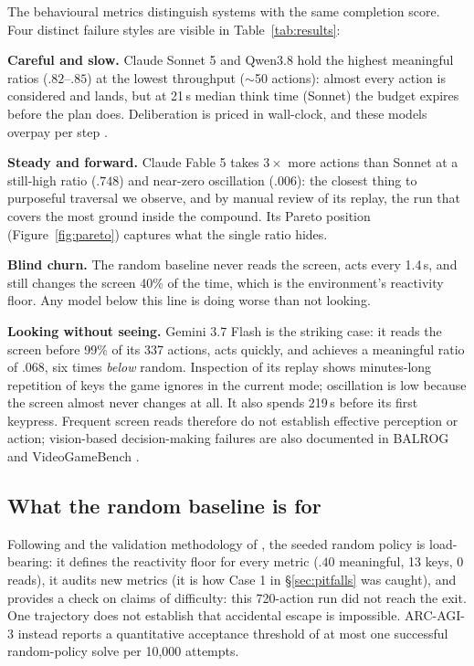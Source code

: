 \documentclass{article} %
\begin{document}
The behavioural metrics distinguish systems with the same completion score.
Four distinct failure styles are visible in
Table~\ref{tab:results}:

\textbf{Careful and slow.} Claude Sonnet 5 and Qwen3.8 hold the highest
meaningful ratios ($.82$--$.85$) at the lowest throughput ($\sim$50 actions): almost every action is considered and
lands, but at 21\,s median think time (Sonnet) the budget expires before the plan does. Deliberation is priced in
wall-clock, and these models overpay per step
\citep[cf.\ dynamic thinking in][]{phan2025textquests}.

\textbf{Steady and forward.} Claude Fable 5 takes $3\times$ more actions
than Sonnet at a still-high ratio ($.748$) and near-zero oscillation ($.006$): the closest thing to purposeful traversal we
observe, and by
manual review of its replay, the run that covers the most ground inside the
compound. Its Pareto position (Figure~\ref{fig:pareto}) captures what the
single ratio hides.

\textbf{Blind churn.} The random baseline never reads the screen, acts
every 1.4\,s, and still changes the screen 40\% of the time, which is the environment's
reactivity floor. Any model below this line is doing worse
than not looking.

\textbf{Looking without seeing.} Gemini 3.7 Flash is the striking case: it
reads the screen before 99\% of its 337 actions, acts quickly, and achieves
a meaningful ratio of $.068$, six times \emph{below} random. Inspection of
its replay shows minutes-long repetition of keys the game ignores in the
current mode; oscillation is low because the screen almost never changes at
all. It also spends 219\,s before its first keypress. Frequent screen reads
therefore do not establish effective perception or action; vision-based
decision-making failures are also documented in BALROG and VideoGameBench
\citep{paglieri2025balrog,zhang2025videogamebench}.

\subsection{What the random baseline is for}

Following \citet{hafner2021benchmarking} and the validation methodology of
\citet{arc2026arcagi3}, the seeded random policy is load-bearing: it defines the reactivity floor for every metric ($.40$ meaningful, 13
keys, 0 reads), it audits new metrics (it is how Case 1 in \S\ref{sec:pitfalls} was caught),
and provides a check on claims of difficulty: this 720-action run did not
reach the exit. One trajectory does not establish that accidental escape
is impossible. ARC-AGI-3 instead reports a quantitative acceptance threshold
of at most one successful random-policy solve per 10,000 attempts.
\end{document}
